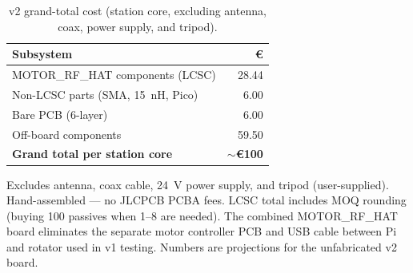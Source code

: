 \begin{table}[H]
    \centering
    \begin{tabular}{lr}
        \toprule
        Subsystem & \euro{} \\
        \midrule
        MOTOR\_RF\_HAT components (LCSC) & 28.44 \\
        Non-LCSC parts (SMA, 15~nH, Pico) & 6.00 \\
        Bare PCB (6-layer) & 6.00 \\
        Off-board components & 59.50 \\
        \midrule
        \textbf{Grand total per station core} & \textbf{$\sim$€100} \\
        \bottomrule
    \end{tabular}
    \caption{v2 grand-total cost (station core, excluding antenna, coax, power supply, and tripod).}
    \label{tab:bom-grand-total}
\end{table}

Excludes antenna, coax cable, 24~V power supply, and tripod (user-supplied). Hand-assembled --- no JLCPCB PCBA fees. LCSC total includes MOQ rounding (buying 100 passives when 1--8 are needed). The combined MOTOR\_RF\_HAT board eliminates the separate motor controller PCB and USB cable between Pi and rotator used in v1 testing. Numbers are projections for the unfabricated v2 board.
